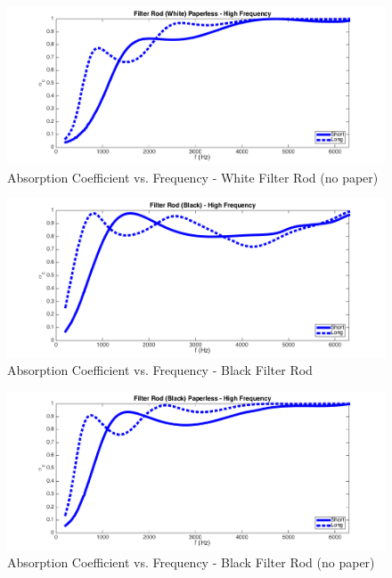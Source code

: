 \begin{figure}[hbtp]
    \centering
    \includegraphics[width=1\textwidth]{Chapter-4/figs/Afigfilterrodwhitenopaper}
    \caption{Absorption Coefficient vs. Frequency - White Filter Rod (no paper)}
    \label{fig:Afigfilterrodwhitenopaper}
\end{figure}

\begin{figure}[hbtp]
    \centering
    \includegraphics[width=1\textwidth]{Chapter-4/figs/Afigfilterrodblack}
    \caption{Absorption Coefficient vs. Frequency - Black Filter Rod}
    \label{fig:Afigfilterrodblack}
\end{figure}

\begin{figure}[hbtp]
    \centering
    \includegraphics[width=1\textwidth]{Chapter-4/figs/Afigfilterrodblacknopaper}
    \caption{Absorption Coefficient vs. Frequency - Black Filter Rod (no paper)}
    \label{fig:Afigfilterrodblacknopaper}
\end{figure}
\clearpage

